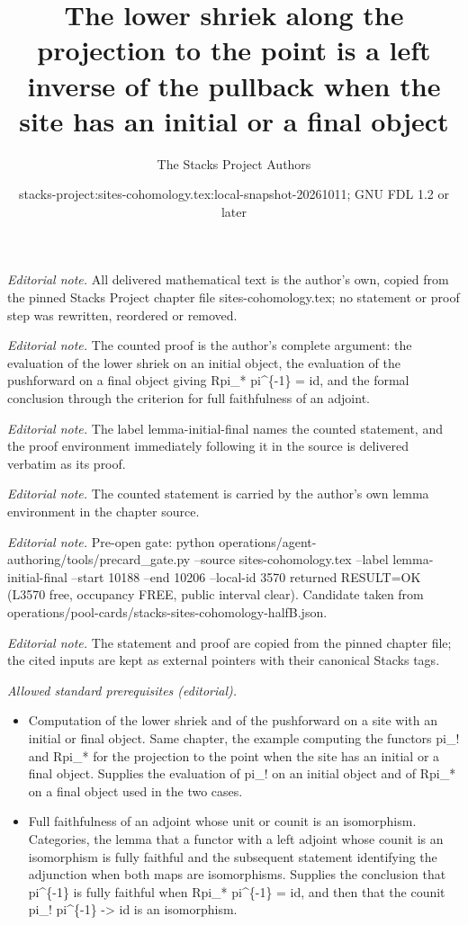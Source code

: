 \documentclass[10pt,a4paper]{amsart}
\title{The lower shriek along the projection to the point is a left inverse of the pullback when the site has an initial or a final object}
\author{The Stacks Project Authors}
\date{stacks-project:sites-cohomology.tex:local-snapshot-20261011; GNU FDL 1.2 or later}
\theoremstyle{plain}
\theoremstyle{definition}
\theoremstyle{remark}
\numberwithin{equation}{subsection}
\begin{document}
\maketitle
\noindent\textit{Editorial note.} All delivered mathematical text is the author's own, copied from the pinned Stacks Project chapter file sites-cohomology.tex; no statement or proof step was rewritten, reordered or removed.\par\medskip
\noindent\textit{Editorial note.} The counted proof is the author's complete argument: the evaluation of the lower shriek on an initial object, the evaluation of the pushforward on a final object giving Rpi\_* pi\textasciicircum{}\{-1\} = id, and the formal conclusion through the criterion for full faithfulness of an adjoint.\par\medskip
\noindent\textit{Editorial note.} The label lemma-initial-final names the counted statement, and the proof environment immediately following it in the source is delivered verbatim as its proof.\par\medskip
\noindent\textit{Editorial note.} The counted statement is carried by the author's own lemma environment in the chapter source.\par\medskip
\noindent\textit{Editorial note.} Pre-open gate: python operations/agent-authoring/tools/precard\_gate.py --source sites-cohomology.tex --label lemma-initial-final --start 10188 --end 10206 --local-id 3570 returned RESULT=OK (L3570 free, occupancy FREE, public interval clear). Candidate taken from operations/pool-cards/stacks-sites-cohomology-halfB.json.\par\medskip
\noindent\textit{Editorial note.} The statement and proof are copied from the pinned chapter file; the cited inputs are kept as external pointers with their canonical Stacks tags.\par\medskip
\noindent\textit{Allowed standard prerequisites (editorial).}\begin{itemize}
\item Computation of the lower shriek and of the pushforward on a site with an initial or final object. Same chapter, the example computing the functors pi\_! and Rpi\_* for the projection to the point when the site has an initial or a final object. Supplies the evaluation of pi\_! on an initial object and of Rpi\_* on a final object used in the two cases.
\item Full faithfulness of an adjoint whose unit or counit is an isomorphism. Categories, the lemma that a functor with a left adjoint whose counit is an isomorphism is fully faithful and the subsequent statement identifying the adjunction when both maps are isomorphisms. Supplies the conclusion that pi\textasciicircum{}\{-1\} is fully faithful when Rpi\_* pi\textasciicircum{}\{-1\} = id, and then that the counit pi\_! pi\textasciicircum{}\{-1\} -> id is an isomorphism.
\end{itemize}\medskip
\end{document}
